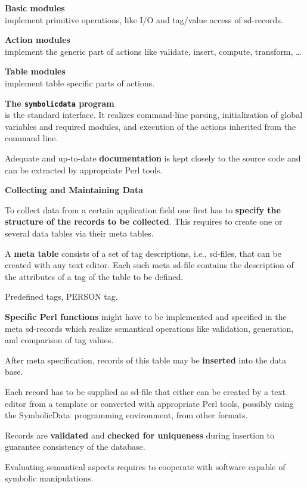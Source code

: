 \documentclass{slides}
\newcommand{\SD}{{\sc Symbolic\-Data}}
\newcommand{\titel}[1]{\begin{center}\large\bf #1\end{center}}
\begin{document}
{\bf Basic modules}\\ implement primitive operations, like I/O
and tag/value access of sd-records.

{\bf Action modules}\\ implement the generic part of actions like
validate, insert, compute, transform, \ldots
 
{\bf Table modules}\\ implement table specific parts of actions.

{\bf The {\tt symbolicdata} program}\\ is the standard interface. It
realizes command-line parsing, initialization of global variables and
required modules, and execution of the actions inherited from the
command line.

Adequate and up-to-date {\bf documentation} is kept closely to the
source code and can be extracted by appropriate Perl tools.
\pagebreak

\titel{Collecting and Maintaining Data}

To collect data from a certain application field one first has to {\bf
specify the structure of the records to be collected}. This requires
to create one or several data tables via their meta tables.

A {\bf meta table} consists of a set of tag descriptions, i.e.,
sd-files, that can be created with any text editor.  Each such meta
sd-file contains the description of the attributes of a tag of the
table to be defined.

Predefined tags, PERSON tag.

{\bf Specific Perl functions} might have to be implemented and
specified in the meta sd-records which realize semantical operations
like validation, generation, and comparison of tag values.

After meta specification, records of this table may be {\bf inserted}
into the data base. 

Each record has to be supplied as sd-file that either can be created
by a text editor from a template or converted with appropriate Perl
tools, possibly using the \SD\ programming environment, from other
formats.

Records are {\bf validated} and {\bf checked for uniqueness} during
insertion to guarantee consistency of the database.  

Evaluating semantical aspects requires to cooperate with software
capable of symbolic manipulations.
\pagebreak
\end{document}
